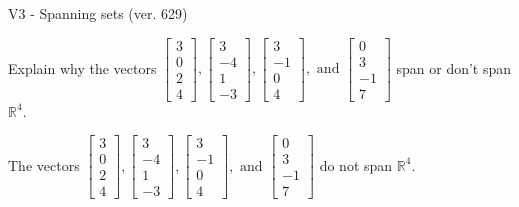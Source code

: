 \begin{exercise}
  \begin{exerciseTitle}V3 - Spanning sets (ver. 629)\end{exerciseTitle}
  \begin{exerciseStatement}
    Explain why the vectors \(\left[\begin{array}{r}
3 \\
0 \\
2 \\
4
\end{array}\right] , \left[\begin{array}{r}
3 \\
-4 \\
1 \\
-3
\end{array}\right] , \left[\begin{array}{r}
3 \\
-1 \\
0 \\
4
\end{array}\right] , \text{ and } \left[\begin{array}{r}
0 \\
3 \\
-1 \\
7
\end{array}\right]\) span or don't span \(\mathbb{R}^4\). 
	


  \end{exerciseStatement}
  \begin{exerciseAnswer}
   The vectors \(\left[\begin{array}{r}
3 \\
0 \\
2 \\
4
\end{array}\right] , \left[\begin{array}{r}
3 \\
-4 \\
1 \\
-3
\end{array}\right] , \left[\begin{array}{r}
3 \\
-1 \\
0 \\
4
\end{array}\right] , \text{ and } \left[\begin{array}{r}
0 \\
3 \\
-1 \\
7
\end{array}\right]\) 
  	 do not  
	span \(\mathbb{R}^4\).
  


  \end{exerciseAnswer}
\end{exercise}